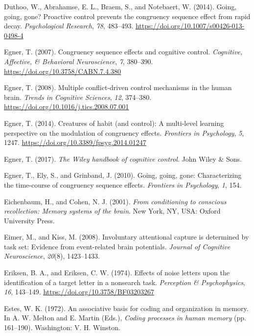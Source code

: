 \documentclass[]{DissertateCUNY}
\begin{document}
\leavevmode\hypertarget{ref-duthoo_going_2014}{}%
Duthoo, W., Abrahamse, E. L., Braem, S., and Notebaert, W. (2014).
Going, going, gone? Proactive control prevents the congruency sequence
effect from rapid decay. \emph{Psychological Research}, \emph{78},
483--493. \url{https://doi.org/10.1007/s00426-013-0498-4}

\leavevmode\hypertarget{ref-egner_congruency_2007}{}%
Egner, T. (2007). Congruency sequence effects and cognitive control.
\emph{Cognitive, Affective, \& Behavioral Neuroscience}, \emph{7},
380--390. \url{https://doi.org/10.3758/CABN.7.4.380}

\leavevmode\hypertarget{ref-egner_multiple_2008}{}%
Egner, T. (2008). Multiple conflict-driven control mechanisms in the
human brain. \emph{Trends in Cognitive Sciences}, \emph{12}, 374--380.
\url{https://doi.org/10.1016/j.tics.2008.07.001}

\leavevmode\hypertarget{ref-egner_creatures_2014}{}%
Egner, T. (2014). Creatures of habit (and control): A multi-level
learning perspective on the modulation of congruency effects.
\emph{Frontiers in Psychology}, \emph{5}, 1247.
\url{https://doi.org/10.3389/fpsyg.2014.01247}

\leavevmode\hypertarget{ref-egner_wiley_2017}{}%
Egner, T. (2017). \emph{The Wiley handbook of cognitive control}. John
Wiley \& Sons.

\leavevmode\hypertarget{ref-egner_going_2010}{}%
Egner, T., Ely, S., and Grinband, J. (2010). Going, going, gone:
Characterizing the time-course of congruency sequence effects.
\emph{Frontiers in Psychology}, \emph{1}, 154.

\leavevmode\hypertarget{ref-eichenbaum_conditioning_2001}{}%
Eichenbaum, H., and Cohen, N. J. (2001). \emph{From conditioning to
conscious recollection: Memory systems of the brain}. New York, NY, USA:
Oxford University Press.

\leavevmode\hypertarget{ref-eimer_involuntary_2008}{}%
Eimer, M., and Kiss, M. (2008). Involuntary attentional capture is
determined by task set: Evidence from event-related brain potentials.
\emph{Journal of Cognitive Neuroscience}, \emph{20}(8), 1423--1433.

\leavevmode\hypertarget{ref-eriksen_effects_1974}{}%
Eriksen, B. A., and Eriksen, C. W. (1974). Effects of noise letters upon
the identification of a target letter in a nonsearch task.
\emph{Perception \& Psychophysics}, \emph{16}, 143--149.
\url{https://doi.org/10.3758/BF03203267}

\leavevmode\hypertarget{ref-melton_associative_1972}{}%
Estes, W. K. (1972). An associative basis for coding and organization in
memory. In A. W. Melton and E. Martin (Eds.), \emph{Coding processes in
human memory} (pp. 161--190). Washington: V. H. Winston.
\end{document}
